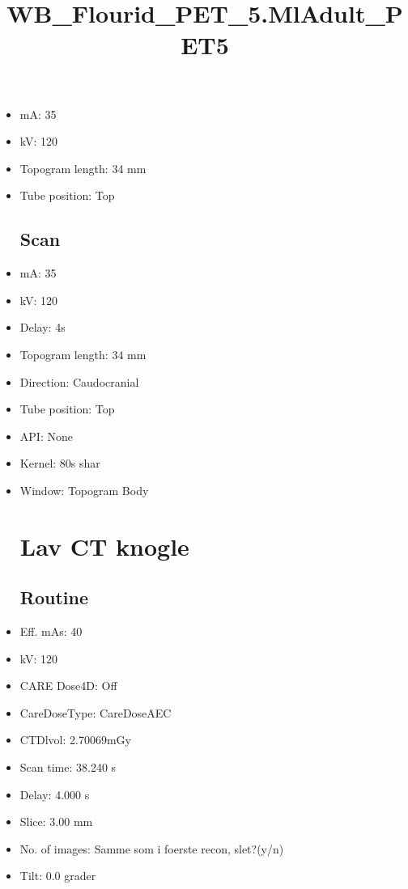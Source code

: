 \documentclass[12pt]{article}
\title{WB\_Flourid\_PET\_5.MlAdult\_PET5}
\begin{document}
\maketitle
\newpage
\tableofcontents
\newpage
{}


\begin{itemize}[noitemsep]\section{Topogram}
\subsection{Routine}
\item mA: 35\item kV: 120\item Topogram length: 34 mm\item Tube position: Top
\subsection{Scan}\item mA: 35\item kV: 120\item Delay: 4s\item Topogram length: 34 mm\item Direction: Caudocranial\item Tube position: Top\item API: None\item Kernel: 80s shar\item Window: Topogram Body
\section{Lav CT knogle}
\subsection{Routine}
\item Eff. mAs: 40\item kV: 120\item CARE Dose4D: Off\item CareDoseType: CareDoseAEC\item CTDlvol: 2.70069mGy\item Scan time: 38.240 s\item Delay: 4.000 s\item Slice: 3.00 mm\item No. of images: Samme som i foerste recon, slet?(y/n)\item Tilt: 0.0 grader

\end{itemize}
\end{document}
